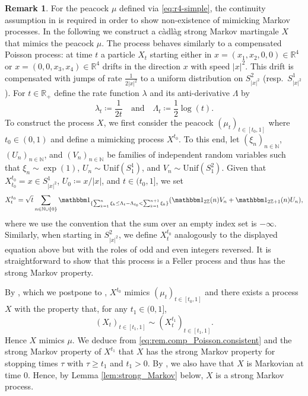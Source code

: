 \documentclass[12pt,oneside]{amsart}
\theoremstyle{definition}
\newtheorem{remark}[theorem]{Remark}
\newcommand{\N}{\mathbb N}
\newcommand{\R}{\mathbb R}
\def\R{{\mathbb R}}
\numberwithin{equation}{section}
\begin{document}
\begin{remark}\label{rem:ex-cadlag}
		For the peacock $\mu$ defined via \eqref{eq:r4-simple}, the continuity assumption in  is required in order to show non-existence of mimicking Markov processes.
        In the following we construct a c\`adl\`ag strong Markov martingale $X$ that mimics the peacock $\mu$. 
        The process behaves similarly to a compensated Poisson process:
        at time $t$ a particle $X_t$ starting either in $x = (x_1,x_2,0,0) \in \R^4$ or $x = (0,0,x_3,x_4) \in \R^4$ drifts in the direction $x$ with speed $|x|^2$.
        This drift is compensated with jumps of rate $\frac{1}{2|x|^2}$ to a uniform distribution on $S^2_{|x|^2}$ (resp.\ $S^1_{|x|^2}$).
        For $t \in \R_+$ define the rate function $\lambda$ and its anti-derivative $\Lambda$ by
        \begin{equation}
            \lambda_t \coloneqq \frac1{2t} \quad\mbox{and}\quad \Lambda_t \coloneqq \frac12 \log(t).
        \end{equation}
        To construct the process $X$, we first consider the peacock $(\mu_t)_{t \in [t_0,1]}$ where $t_0 \in (0,1)$ and define a mimicking process $X^{t_0}$.
        To this end, let $(\xi_n)_{n \in \N}$, $(U_n)_{n \in \N}$, and $(V_n)_{n \in \N}$ be families of independent random variables such that $\xi_n \sim \exp(1)$, $U_n \sim \text{Unif}(S^1_1)$, and $V_n \sim \text{Unif}(S^2_1)$.
        Given that $X_{t_0}^{t_0} = x \in S^1_{|x|^2}$, $U_0 \coloneqq x / |x|$, and $t \in (t_0,1]$, we set
        \begin{equation}
            X_t^{t_0} = \sqrt{t}\sum_{n \in \N \cup \{ 0 \} } \mathbbm 1_{\{\sum_{k = 1}^n \xi_k \le \Lambda_t - \Lambda_{t_0} < \sum_{k = 1}^{n + 1} \xi_k\}} \!\left( \mathbbm 1_{2 \mathbb Z}(n) V_n + \mathbbm 1_{2\mathbb Z + 1}(n) U_n \right)\!,
        \end{equation}
        where we use the convention that the sum over an empty index set is $-\infty$.
        Similarly, when starting in $S^2_{|x|^2}$, we define $X_t^{t_0}$ analogously to the displayed equation above but with the roles of odd and even integers reversed.
        It is straightforward to show that this process is a Feller process and thus has the strong Markov property.
        
        By , which we postpone to , $X^{t_0}$ mimics $(\mu_t)_{t \in [t_0, 1]}$ and there exists a process $X$ with the property that, for any $t_1 \in (0, 1]$,
         \begin{equation}
            \label{eq:rem.comp_Poisson.consistent}
            (X_t)_{t \in [t_1,1]} \sim (X^{t_1}_t)_{t \in [t_1,1]}.
        \end{equation}
        Hence $X$ mimics $\mu$. We deduce from \eqref{eq:rem.comp_Poisson.consistent} and the strong Markov property of $X^{t_1}$ that $X$ has the strong Markov property for stopping times $\tau$ with $\tau \ge t_1$ and $t_1 > 0$. By , we also have that $X$ is Markovian at time $0$. Hence, by Lemma \ref{lem:strong_Markov} below, $X$ is a strong Markov process.
\end{remark}
\end{document}
